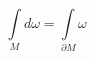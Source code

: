 \documentclass[a4paper, 12pt]{article}
\begin{document}
    \[
        \int\limits_{M} d\omega = \int\limits_{\partial M} \omega
    \]
\end{document}

